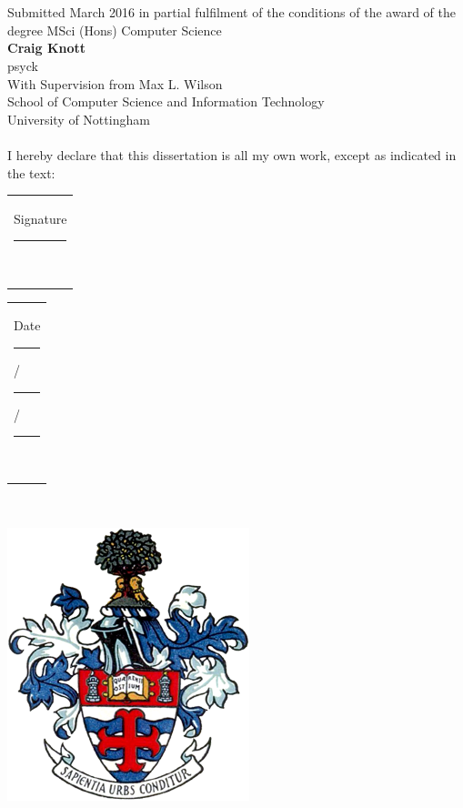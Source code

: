 \begin{center}
\ \\[1cm]
\LARGE{\textbf{\paperTitleStart}}\ \\[0.5cm]
\large{Submitted March 2016 in partial fulfilment of the conditions of the award of the degree MSci (Hons) Computer Science}
\ \\[1cm]
\large{\textbf{Craig Knott}} \ \\
\large{psyck}\ \\[0.3cm]

With Supervision from Max L. Wilson\\[0.3cm]

School of Computer Science and Information Technology \ \\
University of Nottingham \ \\
 \ \\[0.5cm]
I hereby declare that this dissertation is all my own work, except as indicated in the text: \ \\[1cm]
\end{center}

\begin{Large}
\begin{center}
\begin{tabular}{l}
Signature \rule{5cm}{1pt} \ \\[0.2cm]
\end{tabular}
\end{center}

\begin{center}
\begin{tabular}{l}
Date \rule{1.5cm}{1pt}/\rule{1.5cm}{1pt}/\rule{1.5cm}{1pt}\ \\
\end{tabular}
\end{center}
\end{Large}

\ \\[0.6cm]
\begin{center}
\includegraphics[scale=0.55]{images/UoN_Arms}
\end{center}